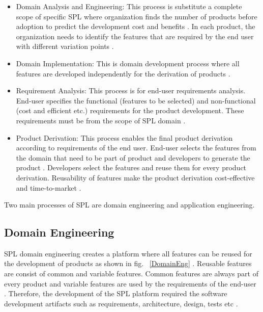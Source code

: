 \begin{itemize}
	\item Domain Analysis and Engineering: This process is substitute a complete scope of specific SPL where organization finds the number of products before adoption to predict the development cost and benefits \cite{t46, t47}. In each product, the organization needs to identify the features that are required by the end user with different variation points \cite{t48}.
	\item Domain Implementation: This is domain development process where all features are developed independently for the derivation of products \cite{t49}.
	
	\item Requirement Analysis: This process is for end-user requirements analysis. End-user specifies the functional (features to be selected) and non-functional (cost and efficient etc.) requirements for the product development. These requirements must be from the scope of SPL domain \cite{t50, t51}.
	
	\item Product Derivation: This process enables the final product derivation according to requirements of the end user. End-user selects the features from the domain that need to be part of product and developers to generate the product \cite{t52, t53}. Developers select the features and reuse them for every product derivation. Reusability of features make the product derivation cost-effective and time-to-market \cite{t54}.
	
\end{itemize}

Two main processes of SPL are domain engineering and application engineering.

\subsection{Domain Engineering}

SPL domain engineering creates a platform where all features can be reused for the development of products \cite{t55} as shown in fig. ~\ref{DomainEng} \cite{tt59}. Reusable features are consist of common and variable features. Common features are always part of every product and variable features are used by the requirements of the end-user \cite{t56, t57, t58}. Therefore, the development of the SPL platform required the software development artifacts such as requirements, architecture, design, tests etc \cite{t59}.



